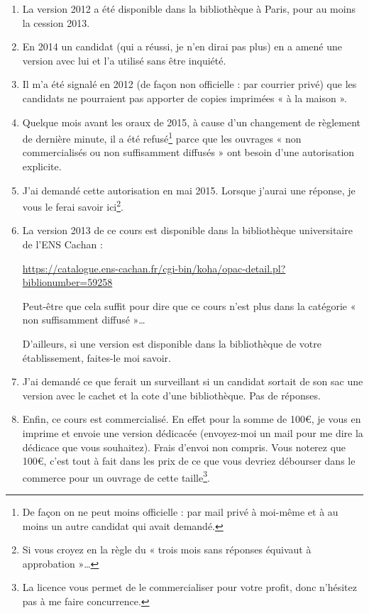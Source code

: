 \begin{enumerate}
    \item
        La version 2012 a été disponible dans la bibliothèque à Paris, pour au moins la cession 2013.
    \item
        En 2014 un candidat (qui a réussi, je n'en dirai pas plus) en a amené une version avec lui et l'a utilisé sans être inquiété.
    \item 
        Il m'a été signalé en 2012 (de façon non officielle : par courrier privé) que les candidats ne pourraient pas apporter de copies imprimées « à la maison ».
    \item
        Quelque mois avant les oraux de 2015, à cause d'un changement de règlement de dernière minute, il a été refusé\footnote{De façon on ne peut moins officielle : par mail privé à moi-même et à au moins un autre candidat qui avait demandé.} parce que les ouvrages « non commercialisés ou non suffisamment diffusés » ont besoin d'une autorisation explicite.
    \item
        J'ai demandé cette autorisation en mai 2015. Lorsque j'aurai une réponse, je vous le ferai savoir ici\footnote{Si vous croyez en la règle du « trois mois sans réponses équivaut à approbation »\ldots}.
    \item
        La version 2013 de ce cours est disponible dans la bibliothèque universitaire de l'ENS Cachan :
        \begin{center}
            \url{https://catalogue.ens-cachan.fr/cgi-bin/koha/opac-detail.pl?biblionumber=59258}
        \end{center}
        Peut-être que cela suffit pour dire que ce cours n'est plus dans la catégorie « non suffisamment diffusé »\ldots

        D'ailleurs, si une version est disponible dans la bibliothèque de votre établissement, faites-le moi savoir.
    \item
        J'ai demandé ce que ferait un surveillant si un candidat sortait de son sac une version avec le cachet et la cote d'une bibliothèque. Pas de réponses.
    \item
        Enfin, ce cours est commercialisé. En effet pour la somme de 100€, je vous en imprime et envoie une version dédicacée (envoyez-moi un mail pour me dire la dédicace que vous souhaitez). Frais d'envoi non compris. Vous noterez que 100€, c'est tout à fait dans les prix de ce que vous devriez débourser dans le commerce pour un ouvrage de cette taille\footnote{La licence vous permet de le commercialiser pour votre profit, donc n'hésitez pas à me faire concurrence.}.
\end{enumerate}

